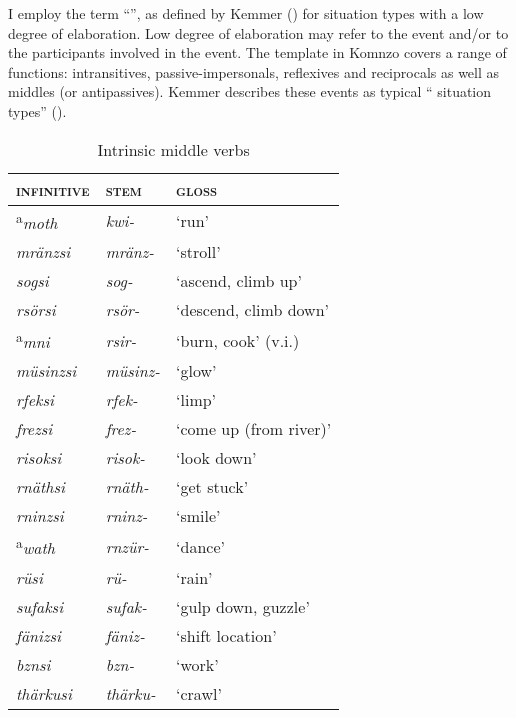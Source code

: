 I employ the term ``'', as defined by Kemmer (\citeyear[207-210]{Kemmer:1993wda}) for situation types with a low degree of elaboration. Low degree of elaboration may refer to the event and/or to the participants involved in the event. The  template in Komnzo covers a range of functions: intransitives, passive-impersonals, reflexives and reciprocals as well as  middles (or antipassives). Kemmer describes these events as typical `` situation types'' (\citeyear[15]{Kemmer:1993wda}).

\begin{table}
\caption{Intrinsic middle verbs}
\label{intrinsicmiddleverbs}
	\begin{tabular}{lll}
		\lsptoprule
		\textsc{infinitive} & \Ext{} \textsc{stem}		& \textsc{gloss}\\  \hline
		\textsuperscript{a}\emph{moth}		& \emph{kwi-}				& `run'\\
		\emph{mränzsi}		& \emph{mränz-}				& `stroll'\\
		\emph{sogsi}		& \emph{sog-}				& `ascend, climb up'\\
		\emph{rsörsi}		& \emph{rsör-}				& `descend, climb down'\\
		\textsuperscript{a}\emph{mni}		& \emph{rsir-}				& `burn, cook' (v.i.)\\
		\emph{müsinzsi}		& \emph{müsinz-}			& `glow'\\
		\emph{rfeksi}		& \emph{rfek-}				& `limp'\\
		\emph{frezsi}		& \emph{frez-}				& `come up (from river)'\\
		\emph{risoksi}		& \emph{risok-}				& `look down'\\
		\emph{rnäthsi}		& \emph{rnäth-}				& `get stuck'\\
		\emph{rninzsi}		& \emph{rninz-}				& `smile'\\
		\textsuperscript{a}\emph{wath}		& \emph{rnzür-}				& `dance'\\
		\emph{rüsi}			& \emph{rü-}				& `rain'\\
		\emph{sufaksi}		& \emph{sufak-}				& `gulp down, guzzle'\\
		\emph{fänizsi}		& \emph{fäniz-}				& `shift location'\\
		\emph{bznsi}		& \emph{bzn-}				& `work'\\
		\emph{thärkusi}		& \emph{thärku-}			& `crawl'\\

\end{tabular}
\end{table}
